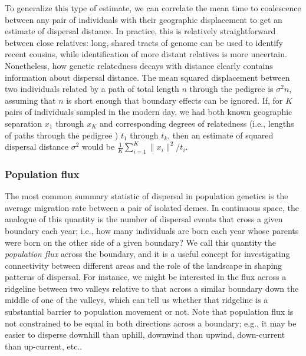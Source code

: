 \documentclass{ar-1col}
\newcommand{\plr}[1]{{\color{green}{#1}}}
\newcommand{\todo}[1]{{\textbf{\color{red}{#1}}}}
\begin{document}
To generalize this type of estimate,
we can correlate the mean time to coalescence between any pair of individuals
with their geographic displacement
to get an estimate of dispersal distance.
In practice,
this is relatively straightforward between close relatives:
long, shared tracts of genome can be used to identify recent cousins,
while identification of more distant relatives is more uncertain.
Nonetheless, how genetic relatedness decays with distance
clearly contains information about dispersal distance.
The mean squared displacement between two individuals
related by a path of total length $n$ through the pedigree
is $\sigma^2 n$,
assuming that $n$ is short enough that boundary effects can be ignored.
If, for $K$ pairs of individuals sampled in the modern day,
we had both known geographic separation $x_1$ through $x_K$
and corresponding degrees of relatedness 
(i.e., lengths of paths through the pedigree \plr{fixme})
$t_1$ through $t_k$,
then an estimate of squared dispersal distance $\sigma^2$ would be
$\frac{1}{K}\sum_{i=1}^K \|x_i\|^2 / t_i$.

\todo{tidy and conclude}



\subsubsection{Population flux}

The most common summary statistic of dispersal in population genetics
is the average migration rate between a pair of isolated demes.
In continuous space, the analogue of this quantity
is the number of dispersal events that cross
a given boundary each year;
i.e., how many individuals are born each year whose parents
were born on the other side of a given boundary?
We call this quantity the \textit{population flux} across the boundary,
and it is a useful concept for investigating connectivity between different areas
and the role of the landscape in shaping patterns of dispersal.
For instance,
we might be interested in the flux across a ridgeline between two valleys
relative to that across a similar boundary down the middle of one of the valleys,
which can tell us whether that ridgeline is a substantial barrier to population movement or not.
Note that population flux is not constrained to be equal in both directions across a boundary;
e.g., it may be easier to disperse downhill than uphill,
downwind than upwind,
down-current than up-current, etc..
\end{document}
